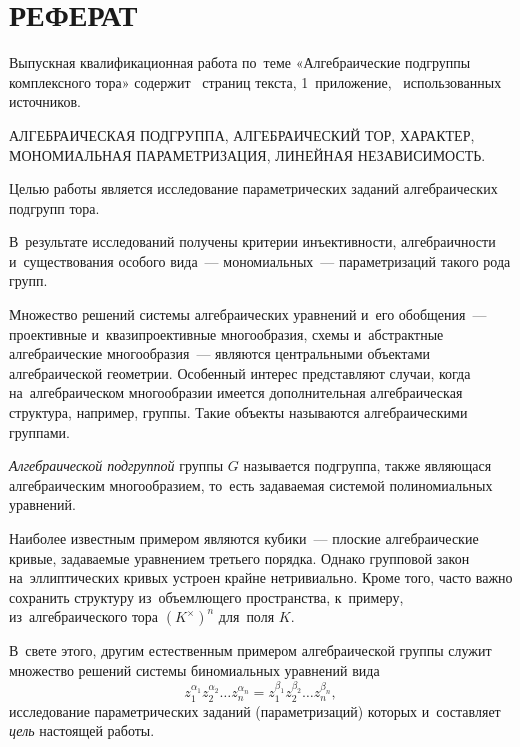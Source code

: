\documentclass[a4paper,oneside]{article}
\def\title{Алгебраические подгруппы комплексного тора}
\begin{document}
\section*{\centering\MakeUppercase{Реферат}}\thispagestyle{empty}

Выпускная квалификационная работа по~теме «\title»
содержит \pageref{TheEnd}~страниц текста, 1~приложение, ~использованных источников.

\MakeUppercase{Алгебраическая подгруппа, алгебраический тор, характер, мономиальная параметризация,
линейная независимость.}

Целью работы является исследование параметрических заданий алгебраических подгрупп тора.

В~результате исследований получены критерии инъективности, алгебраичности и~существования
особого вида~— мономиальных~— параметризаций такого рода групп.

\pagebreak

\renewcommand{\contentsname}{\hfill\bfseries\normalsize\MakeUppercase{Содержание}\hfill}
\renewcommand{\cftaftertoctitle}{\hfill}
\renewcommand{\cftsecleader}{\cftdotfill{\cftdotsep}}
\tableofcontents
\thispagestyle{empty}

\pagebreak

Множество решений системы алгебраических уравнений и его обобщения~— проективные и~квазипроективные многообразия,
схемы и~абстрактные алгебраические многообразия~— являются центральными объектами алгебраической геометрии.
Особенный интерес представляют случаи, когда на~алгебраическом многообразии имеется дополнительная алгебраическая структура,
например, группы. Такие объекты называются алгебраическими группами.

\textit{Алгебраической подгруппой} группы $G$ называется подгруппа, также являющася
алгебраическим многообразием, то~есть задаваемая системой полиномиальных уравнений.

Наиболее известным примером являются кубики~— плоские алгебраические кривые, задаваемые уравнением третьего порядка.
Однако групповой закон на~эллиптических кривых устроен крайне нетривиально. Кроме того, часто важно сохранить структуру
из~объемлющего пространства, к~примеру, из~алгебраического тора $(K^\times)^n$ для~поля $K$.

В~свете этого, другим естественным примером алгебраической группы служит множество решений системы биномиальных уравнений вида
\[
  z_1^{\alpha_1} z_2^{\alpha_2} \ldots z_n^{\alpha_n} = z_1^{\beta_1} z_2^{\beta_2} \ldots z_n^{\beta_n},
\]
исследование параметрических заданий (параметризаций) которых и~составляет \textit{цель} настоящей работы.
\end{document}
